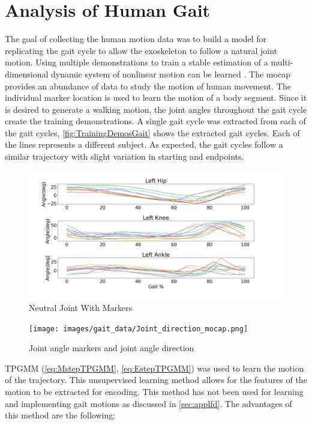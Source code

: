 \section{Analysis of Human Gait}

The goal of collecting the human motion data was to build a model for replicating the gait cycle to allow the exoskeleton to follow a natural joint motion. Using multiple demonstrations to train a stable estimation of a multi-dimensional dynamic system of nonlinear motion can be learned \cite{li2018development}. The mocap provides an abundance of data to study the motion of human movement. The individual marker location is used to learn the motion of a body segment. Since it is desired to generate a walking motion, the joint angles throughout the gait cycle create the training demonstrations.  A single gait cycle was extracted from each of the gait cycles,  \autoref{fig:TrainingDemosGait} shows the extracted gait cycles. Each of the lines represents a different subject. As expected, the gait cycles follow a similar trajectory with slight variation in starting and endpoints. 

\begin{figure}[h]
    \centering
    \includegraphics[scale=0.30]{images/gait_data/gaittraining.png}
    \caption[Raw Joint Trajectories Collected from the Subjects]{Neutral Joint With Markers}
    \label{fig:TrainingDemosGait}
\end{figure}

\begin{figure}[h]
    \centering
    \texttt{[image: images/gait\_data/Joint\_direction\_mocap.png]}
    \caption[Gait Training Demos]{Joint angle markers and joint angle direction}
    \label{fig:TrainingJointPosition}
\end{figure}

TPGMM (\autoref{eq:MstepTPGMM}, \autoref{eq:EstepTPGMM}) was used to learn the motion of the trajectory. This unsupervised learning method allows for the features of the motion to be extracted for encoding. This method has not been used for learning and implementing gait motions as discussed in \autoref{sec:applfd}.  The advantages of this method are the following:

